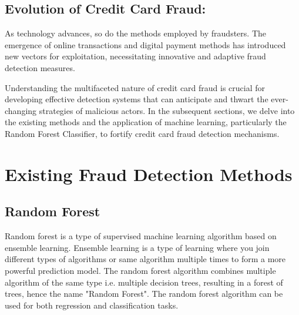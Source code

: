 \subsection{Evolution of Credit Card Fraud:}

As technology advances, so do the methods employed by fraudsters. The emergence of online transactions and digital payment methods has introduced new vectors for exploitation, necessitating innovative and adaptive fraud detection measures.\medskip

Understanding the multifaceted nature of credit card fraud is crucial for developing effective detection systems that can anticipate and thwart the ever-changing strategies of malicious actors. In the subsequent sections, we delve into the existing methods and the application of machine learning, particularly the Random Forest Classifier, to fortify credit card fraud detection mechanisms.







\section{Existing Fraud Detection Methods}

\subsection{Random Forest}

Random forest is a type of supervised machine learning
algorithm based on ensemble learning. Ensemble learning is
a type of learning where you join different types of
algorithms or same algorithm multiple times to form a more
powerful prediction model. The random forest algorithm
combines multiple algorithm of the same type i.e. multiple
decision trees, resulting in a forest of trees, hence the name
"Random Forest". The random forest algorithm can be used
for both regression and classification tasks.\medskip

